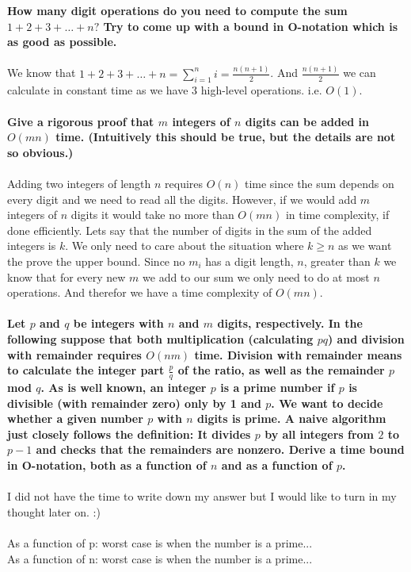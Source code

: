 \documentclass[12pt,oneside,reqno]{amsart}
\begin{document}
\textbf{How many digit operations do you need to compute the sum $1+2+3+\dots+n?$ Try to come up with a bound in O-notation which is as good as possible.}\\\\
We know that $1+2+3+ \dots +n = \sum\limits_{i=1}^n i = \frac{n(n+1)}{2}$. And $\frac{n(n+1)}{2}$ we can calculate in constant time as we have $3$ high-level operations. i.e. $O(1)$.\\\\

\textbf{Give a rigorous proof that $m$ integers of $n$ digits can be added in $O(mn)$ time. (Intuitively this should be true, but the details are not so obvious.)}\\\\
Adding two integers of length $n$ requires $O(n)$ time since the sum depends on every digit and we need to read all the digits. However, if we would add $m$ integers of $n$ digits it would take no more than $O(mn)$ in time complexity, if done efficiently. Lets say that the number of digits in the sum of the added integers is $k$. We only need to care about the situation where $k \geq n$ as we want the prove the upper bound. Since no $m_i$ has a digit length, $n$, greater than $k$ we know that for every new $m$ we add to our sum we only need to do at most $n$ operations. And therefor we have a time complexity of $O(mn)$.\\\\


\textbf{Let $p$ and $q$ be integers with $n$ and $m$ digits, respectively. In the following
suppose that both multiplication (calculating $pq$) and division with remainder
requires $O(nm)$ time. Division with remainder means to calculate the
integer part $\frac{p}{q}$ of the ratio, as well as the remainder $p$ mod $q$.
As is well known, an integer $p$ is a prime number if $p$ is divisible (with
remainder zero) only by 1 and $p$. We want to decide whether a given number
$p$ with $n$ digits is prime. A naive algorithm just closely follows the definition:
It divides $p$ by all integers from $2$ to $p−1$ and checks that the remainders
are nonzero. Derive a time bound in O-notation, both as a function of $n$
and as a function of $p$.}\\\\
I did not have the time to write down my answer but I would like to turn in my thought later on. :)\\\\
As a function of p: worst case is when the number is a prime... \\
As a function of n: worst case is when the number is a prime... 
\end{document}
